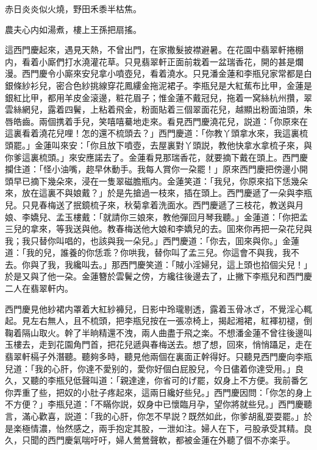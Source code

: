 赤日炎炎似火燒，野田禾黍半枯焦。

農夫心内如湯煮，樓上王孫把扇搖。

這西門慶起來，遇見天熱，不曾出門，在家撒髮披襟避暑。在花園中翡翠軒捲棚内，看着小廝們打水澆灌花草。只見翡翠軒正面前栽着一盆瑞香花，開的甚是爛漫。西門慶令小廝來安兒拿小噴壺兒，看着澆水。只見潘金蓮和李瓶兒家常都是白銀條紗衫兒，密合色紗挑線穿花鳳縷金拖泥裙子。李瓶兒是大紅蕉布比甲，金蓮是銀紅比甲，都用羊皮金滚邊，粧花眉子；惟金蓮不戴冠兒，拖着一窝絲杭州攢，翠雲絲網兒，露着四鬢，上粘着飛金，粉面貼着三個翠面花兒，越顯出粉面油頭，朱唇皓齒。兩個携着手兒，笑嘻嘻驀地走來。看見西門慶澆花兒，説道：「你原來在這裏看着澆花兒哩！怎的還不梳頭去？」西門慶道：「你教丫頭拿水來，我這裏梳頭罷。」金蓮叫來安：「你且放下噴壺，去屋裏對丫頭説，教他快拿水拿梳子來，與你爹這裏梳頭。」來安應諾去了。金蓮看見那瑞香花，就要摘下戴在頭上。西門慶攔住道：「怪小油嘴，趂早休動手。我每人賞你一朶罷！」原來西門慶把傍邊小開頭早已摘下幾朵來，浸在一隻翠磁膽瓶内。金蓮笑道：「我兒，你原來掐下恁幾朵來，放在這裏不與娘戴？」於是先搶過一枝來，插在頭上。西門慶遞了一朵與李瓶兒。只見春梅送了抿鏡梳子來，秋菊拿着洗面水。西門慶遞了三枝花，教送與月娘、李嬌兒、孟玉樓戴：「就請你三娘來，教他彈回月琴我聽。」金蓮道：「你把孟三兒的拿來，等我送與他。教春梅送他大娘和李嬌兒的去。囬來你再把一朶花兒與我；我只替你叫唱的，也該與我一朵兒。」西門慶道：「你去，囬來與你。」金蓮道：「我的兒，誰養的你恁乖？你哄我，替你叫了孟三兒。你這會不與我，我不去。你與了我，我纔叫去。」那西門慶笑道：「賊小淫婦兒，這上頭也掐個尖兒！」於是又與了他一朶。金蓮簪於雲鬢之傍，方纔往後邊去了，止撇下李瓶兒和西門慶二人在翡翠軒内。

西門慶見他紗裙内罩着大紅紗褲兒，日影中玲瓏剔透，露着玉骨冰ざ，不覺淫心輒起。見左右無人，且不梳頭，把李瓶兒按在一張凉椅上，揭起湘裙，紅褌初褪，倒鞠着隔山取火。幹了半晌精還不洩，兩人曲盡于飛之楽。不想潘金蓮不曾往後邊叫玉樓去，走到花園角門首，把花兒遞與春梅送去。想了想，回來，悄悄躡足，走在翡翠軒槅子外潛聽。聽夠多時，聽見他兩個在裏面正幹得好。只聽見西門慶向李瓶兒道：「我的心肝，你達不愛别的，愛你好個白屁股兒，今日儘着你達受用。」良久，又聽的李瓶兒低聲叫道：「親達達，你省可的げ罷，奴身上不方便。我前番乞你弄重了些，把奴的小肚子疼起來，這兩日纔好些兒。」西門慶因問：「你怎的身上不方便？」李瓶兒道：「不瞞你説，奴身中已懷臨月孕，望你將就些兒。」西門慶聽言，滿心歡喜，説道：「我的心肝，你怎不早説？既然如此，你爹胡亂耍耍罷。」於是楽極情濃，怡然感之，兩手抱定其股，一泄如注。婦人在下，弓股承受其精。良久，只聞的西門慶氣喘吁吁，婦人鶯鶯聲軟，都被金蓮在外聽了個不亦楽乎。

